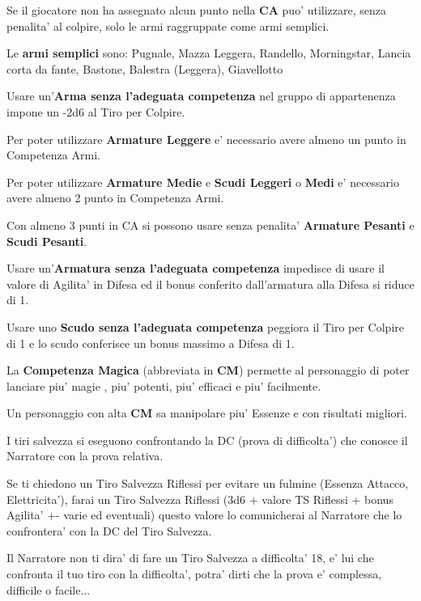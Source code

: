 \documentclass[a4paper,11pt,twoside,openany]{book}
\begin{document}
	Se il giocatore non ha assegnato alcun punto nella \textbf{CA} puo' utilizzare, senza penalita' al colpire, solo le armi raggruppate come armi semplici.
	
	Le \textbf{armi semplici} sono: Pugnale, Mazza Leggera, Randello, Morningstar,
	Lancia corta da fante, Bastone, Balestra (Leggera), Giavellotto
	
	Usare un'\textbf{Arma senza l'adeguata competenza} nel gruppo di appartenenza impone un -2d6 al Tiro per Colpire.
	
	Per poter utilizzare \textbf{Armature Leggere} e' necessario avere almeno un punto in Competenza Armi.
	
	Per poter utilizzare \textbf{Armature Medie} e \textbf{Scudi Leggeri} o \textbf{Medi} e' necessario avere almeno 2 punto in Competenza Armi.
	
	Con almeno 3 punti in CA si possono usare senza penalita' \textbf{Armature Pesanti} e \textbf{Scudi Pesanti}.
	
	Usare un'\textbf{Armatura senza l'adeguata competenza} impedisce di usare il valore di Agilita' in Difesa ed il bonus conferito dall'armatura alla Difesa si riduce di 1.
	
	Usare uno \textbf{Scudo senza l'adeguata competenza} peggiora il Tiro per Colpire di 1 e lo scudo conferisce un bonus massimo a Difesa di 1.
	
	La \textbf{Competenza Magica} (abbreviata in \textbf{CM}) permette al personaggio di poter lanciare piu' magie , piu' potenti, piu' efficaci e piu' facilmente.
	
	Un personaggio con alta \textbf{CM} sa manipolare piu' Essenze e con risultati migliori.
	
	I tiri salvezza si eseguono confrontando la DC (prova di difficolta') che conosce il Narratore con la prova relativa.
	
	Se ti chiedono un Tiro Salvezza Riflessi per evitare un fulmine (Essenza Attacco, Elettricita'), farai un Tiro Salvezza Riflessi (3d6 + valore TS Riflessi + bonus Agilita' +- varie ed eventuali) questo valore lo comunicherai al Narratore che lo confrontera' con la DC del Tiro Salvezza.
	
	Il Narratore non ti dira' di fare un Tiro Salvezza a difficolta' 18, e' lui che confronta il tuo tiro con la difficolta', potra' dirti che la prova e' complessa, difficile o facile...
	
\end{document}
